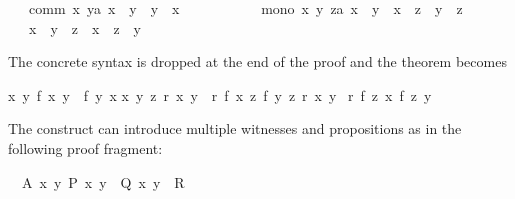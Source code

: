 \begin{isabellebody}
\ \ \ comm{\isacharcolon}\ {\isachardoublequote}{\isasymAnd}x\ y{\isacharcolon}{\isacharcolon}{\isacharprime}a{\isachardot}\ x\ {\isacharplus}{\isacharplus}\ y\ {\isacharequal}\ y\ {\isacharplus}{\isacharplus}\ x{\isachardoublequote}\ \isanewline
\ \ \ \ \ \ \ \ \ \ mono{\isacharcolon}\ {\isachardoublequote}{\isasymAnd}x\ y\ z{\isacharcolon}{\isacharcolon}{\isacharprime}a{\isachardot}\ x\ {\isachargreater}\ y\ {\isasymLongrightarrow}\ x\ {\isacharplus}{\isacharplus}\ z\ {\isachargreater}\ y\ {\isacharplus}{\isacharplus}\ z{\isachardoublequote}\isanewline
\ \ \ {\isachardoublequote}x\ {\isachargreater}\ y\ {\isasymLongrightarrow}\ z\ {\isacharplus}{\isacharplus}\ x\ {\isachargreater}\ z\ {\isacharplus}{\isacharplus}\ y{\isachardoublequote}\isanewline
\isamarkupfalse%
\isamarkupfalse%
%
\begin{isamarkuptext}%
\noindent The concrete syntax is dropped at the end of the proof and the
theorem becomes \begin{isabelle}%
{\isasymlbrakk}{\isasymAnd}x\ y{\isachardot}\ {\isacharquery}f\ x\ y\ {\isacharequal}\ {\isacharquery}f\ y\ x{\isacharsemicolon}\isanewline
\isaindent{\ }{\isasymAnd}x\ y\ z{\isachardot}\ {\isacharquery}r\ x\ y\ {\isasymLongrightarrow}\ {\isacharquery}r\ {\isacharparenleft}{\isacharquery}f\ x\ z{\isacharparenright}\ {\isacharparenleft}{\isacharquery}f\ y\ z{\isacharparenright}{\isacharsemicolon}\ {\isacharquery}r\ {\isacharquery}x\ {\isacharquery}y{\isasymrbrakk}\isanewline
{\isasymLongrightarrow}\ {\isacharquery}r\ {\isacharparenleft}{\isacharquery}f\ {\isacharquery}z\ {\isacharquery}x{\isacharparenright}\ {\isacharparenleft}{\isacharquery}f\ {\isacharquery}z\ {\isacharquery}y{\isacharparenright}%
\end{isabelle}
\tweakskip%
\end{isamarkuptext}%
\isamarkuptrue%
%
\isamarkuptrue%
%
\begin{isamarkuptext}%
The  construct can introduce multiple
witnesses and propositions as in the following proof fragment:%
\end{isamarkuptext}%
\isamarkuptrue%
\ \ A{\isacharcolon}\ {\isachardoublequote}{\isasymexists}x\ y{\isachardot}\ P\ x\ y\ {\isasymand}\ Q\ x\ y{\isachardoublequote}\ \ {\isachardoublequote}R{\isachardoublequote}\isanewline
\isamarkupfalse%
\isamarkupfalse%
\isamarkupfalse%
\isamarkupfalse%
\isamarkupfalse%
\isamarkupfalse%
%
\begin{isamarkuptext}%

\end{isamarkuptext}
\end{isabellebody}
